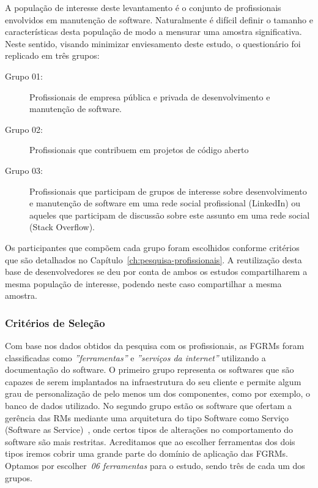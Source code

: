 A população de interesse deste levantamento é o conjunto de profissionais
envolvidos em manutenção de software. Naturalmente é difícil definir o tamanho e
características desta população de modo a mensurar uma amostra significativa.
Neste sentido, visando minimizar enviesamento deste estudo, o questionário
foi replicado em três grupos:

\begin{description}
	\item[Grupo 01:] Profissionais de empresa pública e privada de
			desenvolvimento e manutenção de software.
	\item[Grupo 02:] Profissionais que contribuem em projetos de
		código aberto
	\item[Grupo 03:] Profissionais que participam de grupos de
		interesse sobre desenvolvimento e manutenção de software em uma rede
		social profissional (LinkedIn) ou aqueles que participam de discussão
		sobre este assunto em uma rede social (Stack Overflow).
\end{description}

Os participantes que compõem cada grupo foram escolhidos conforme critérios que
são detalhados no Capítulo~\ref{ch:pesquisa-profissionais}. A reutilização desta
base de desenvolvedores se deu por conta de ambos os estudos compartilharem a
mesma população de interesse, podendo neste caso compartilhar a mesma amostra.

\subsubsection{Critérios de Seleção}
\label{ssub:metodologia_criterios_selecao}

Com base nos dados obtidos da pesquisa com os profissionais, as FGRMs foram
classificadas como \textit{''ferramentas''} e \textit{''serviços da internet''}
utilizando a documentação do software. O primeiro grupo representa os softwares
que são capazes de serem implantados na infraestrutura do seu cliente e permite
algum grau de personalização de pelo menos um dos componentes, como por exemplo,
o banco de dados utilizado. No segundo grupo estão os software que ofertam a
gerência das RMs mediante uma arquitetura do tipo Software como Serviço
(Software as Service)~\cite{fox2013engineering}, onde certos tipos de alterações
no comportamento do software são mais restritas. Acreditamos que ao escolher
ferramentas dos dois tipos iremos cobrir uma grande parte do domínio de
aplicação das FGRMs. Optamos por escolher~\textit{06 ferramentas} para o
estudo, sendo três de cada um dos grupos.

